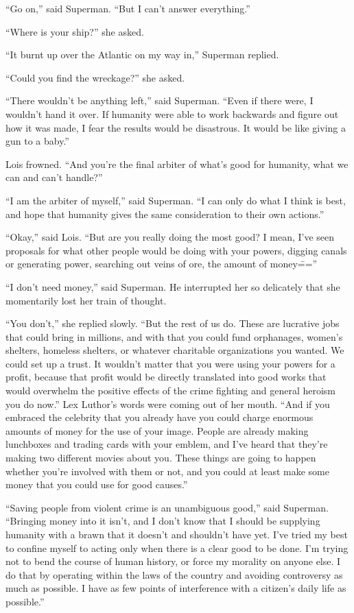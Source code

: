 ``Go on,'' said Superman. ``But I can't answer everything.''

``Where is your ship?'' she asked.

``It burnt up over the Atlantic on my way in,'' Superman replied.

``Could you find the wreckage?'' she asked.

``There wouldn't be anything left,'' said Superman. ``Even if there
were, I wouldn't hand it over. If humanity were able to work backwards
and figure out how it was made, I fear the results would be disastrous.
It would be like giving a gun to a baby.''

Lois frowned. ``And you're the final arbiter of what's good for
humanity, what we can and can't handle?''

``I am the arbiter of myself,'' said Superman. ``I can only do what I
think is best, and hope that humanity gives the same consideration to
their own actions.''

``Okay,'' said Lois. ``But are you really doing the most good? I mean,
I've seen proposals for what other people would be doing with your
powers, digging canals or generating power, searching out veins of ore,
the amount of money\===''

``I don't need money,'' said Superman. He interrupted her so delicately
that she momentarily lost her train of thought.

``You don't,'' she replied slowly. ``But the rest of us do. These are
lucrative jobs that could bring in millions, and with that you could
fund orphanages, women's shelters, homeless shelters, or whatever
charitable organizations you wanted. We could set up a trust. It
wouldn't matter that you were using your powers for a profit, because
that profit would be directly translated into good works that would
overwhelm the positive effects of the crime fighting and general heroism
you do now.'' Lex Luthor's words were coming out of her mouth. ``And if
you embraced the celebrity that you already have you could charge
enormous amounts of money for the use of your image. People are already
making lunchboxes and trading cards with your emblem, and I've heard
that they're making two different movies about you. These things are
going to happen whether you're involved with them or not, and you could
at least make some money that you could use for good causes.''

``Saving people from violent crime is an unambiguous good,'' said
Superman. ``Bringing money into it isn't, and I don't know that I should
be supplying humanity with a brawn that it doesn't and shouldn't have
yet. I've tried my best to confine myself to acting only when there is a
clear good to be done. I'm trying not to bend the course of human
history, or force my morality on anyone else. I do that by operating
within the laws of the country and avoiding controversy as much as
possible. I have as few points of interference with a citizen's daily
life as possible.''

